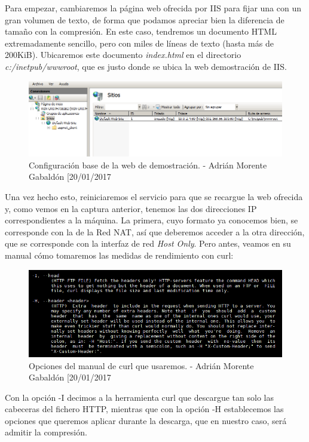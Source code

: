 Para empezar, cambiaremos la página web ofrecida por IIS para fijar una con un gran volumen de texto, de forma que podamos apreciar bien la diferencia de tamaño con la compresión. En este caso, tendremos un documento HTML extremadamente sencillo, pero con miles de líneas de texto (hasta más de 200KiB). Ubicaremos este documento \emph{index.html} en el directorio \emph{c:/inetpub/wwwroot}, que es justo donde se ubica la web demostración de IIS.
\begin{figure}[H]
	\centering
	\includegraphics[scale=0.5]{default-web}
	\caption{Configuración base de la web de demostración. - Adrián Morente Gabaldón [20/01/2017}
	\label{figura14}
\end{figure}

Una vez hecho esto, reiniciaremos el servicio para que se recargue la web ofrecida y, como vemos en la captura anterior, tenemos las dos direcciones IP correspondientes a la máquina. La primera, cuyo formato ya conocemos bien, se corresponde con la de la Red NAT, así que deberemos acceder a la otra dirección, que se corresponde con la interfaz de red \emph{Host Only}. Pero antes, veamos en su manual cómo tomaremos las medidas de rendimiento con curl:
\begin{figure}[H]
	\centering
	\includegraphics[scale=0.6]{man-curl}
	\caption{Opciones del manual de curl que usaremos. - Adrián Morente Gabaldón [20/01/2017}
	\label{figura15}
\end{figure}
Con la opción -I decimos a la herramienta curl que descargue tan solo las cabeceras del fichero HTTP, mientras que con la opción -H establecemos las opciones que queremos aplicar durante la descarga, que en nuestro caso, será admitir la compresión. \\

